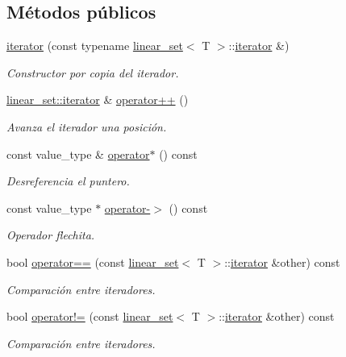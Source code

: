 \subsection*{Métodos públicos}
\begin{DoxyCompactItemize}
\item 
\hyperlink{classlinear__set_1_1iterator_ab60c745272218eee7323209f4f115fbd}{iterator} (const typename \hyperlink{classlinear__set}{linear\-\_\-set}$<$ T $>$\-::\hyperlink{classlinear__set_1_1iterator}{iterator} \&)
\begin{DoxyCompactList}\small\item\em Constructor por copia del iterador. \end{DoxyCompactList}\item 
\hyperlink{classlinear__set_1_1iterator}{linear\-\_\-set\-::iterator} \& \hyperlink{classlinear__set_1_1iterator_a5520c75db974b7f2f61d677bc5ae4d0d}{operator++} ()
\begin{DoxyCompactList}\small\item\em Avanza el iterador una posición. \end{DoxyCompactList}\item 
const value\-\_\-type \& \hyperlink{classlinear__set_1_1iterator_aaa433eb1d7edd4854cda8b27464f0e5f}{operator$\ast$} () const 
\begin{DoxyCompactList}\small\item\em Desreferencia el puntero. \end{DoxyCompactList}\item 
const value\-\_\-type $\ast$ \hyperlink{classlinear__set_1_1iterator_ac7245da07e968927586744ee582df638}{operator-\/$>$} () const 
\begin{DoxyCompactList}\small\item\em Operador flechita. \end{DoxyCompactList}\item 
bool \hyperlink{classlinear__set_1_1iterator_a1e80ff416da110a71b1944bc9f05ed12}{operator==} (const \hyperlink{classlinear__set}{linear\-\_\-set}$<$ T $>$\-::\hyperlink{classlinear__set_1_1iterator}{iterator} \&other) const 
\begin{DoxyCompactList}\small\item\em Comparación entre iteradores. \end{DoxyCompactList}\item 
bool \hyperlink{classlinear__set_1_1iterator_a5c6c1cf3f266116b12563effc6644711}{operator!=} (const \hyperlink{classlinear__set}{linear\-\_\-set}$<$ T $>$\-::\hyperlink{classlinear__set_1_1iterator}{iterator} \&other) const 
\begin{DoxyCompactList}\small\item\em Comparación entre iteradores. \end{DoxyCompactList}\end{DoxyCompactItemize}
